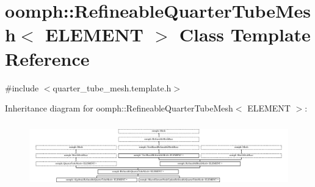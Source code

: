 \hypertarget{classoomph_1_1RefineableQuarterTubeMesh}{}\section{oomph\+:\+:Refineable\+Quarter\+Tube\+Mesh$<$ E\+L\+E\+M\+E\+NT $>$ Class Template Reference}
\label{classoomph_1_1RefineableQuarterTubeMesh}


{\ttfamily \#include $<$quarter\+\_\+tube\+\_\+mesh.\+template.\+h$>$}

Inheritance diagram for oomph\+:\+:Refineable\+Quarter\+Tube\+Mesh$<$ E\+L\+E\+M\+E\+NT $>$\+:\begin{figure}[H]
\begin{center}
\leavevmode
\includegraphics[height=2.852984cm]{classoomph_1_1RefineableQuarterTubeMesh}
\end{center}
\end{figure}
